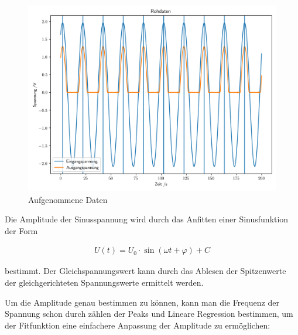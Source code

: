 \documentclass[12pt,twoside,a4paper]{scrartcl}
\begin{document}
			\begin{figure}[H]
				\centering

				\includegraphics[width = 0.8 \textwidth]{Plots/rectifier/Rohdaten}

				\caption{Aufgenommene Daten}
				\label{Gleichrichter::Daten}
			\end{figure}

			Die Amplitude der Sinusspannung wird durch das Anfitten einer Sinusfunktion der Form

			\begin{align*}
				U(t) = U_0 \cdot \sin(\omega t + \varphi) + C
			\end{align*}

			bestimmt. Der Gleichspannungswert kann durch das Ablesen der Spitzenwerte der gleichgerichteten Spannungswerte ermittelt werden.

			Um die Amplitude genau bestimmen zu können, kann man die Frequenz der Spannung schon durch zählen der Peaks und Lineare Regression bestimmen, um der Fitfunktion eine einfachere Anpassung der Amplitude zu ermöglichen:
\end{document}
